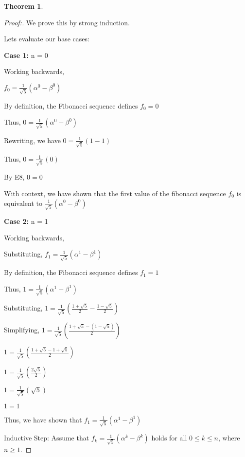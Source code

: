 \documentclass[12pt]{article}
\newtheorem{theorem}{Theorem}[section]
\begin{document}
\newpage

\begin{theorem}
\end{theorem}

\begin{proof}[Proof:]
    We prove this by strong induction.

    Lets evaluate our base cases:

    \medbreak

    \textbf{Case 1:} n = 0

    Working backwards, 

    $f_0 = \frac{1}{\sqrt{5}} (\alpha^0 - \beta^0)$

    By definition, the Fibonacci sequence defines $f_0 = 0$

    Thus, $0 = \frac{1}{\sqrt{5}} (\alpha^0 - \beta^0)$

    Rewriting, we have $0 = \frac{1}{\sqrt{5}} (1 - 1)$

    Thus, $0 = \frac{1}{\sqrt{5}} (0)$

    By E8, $0 = 0$

    With context, we have shown that the first value of the fibonacci sequence $f_0$ is equivalent to $\frac{1}{\sqrt{5}} (\alpha^0 - \beta^0)$

    \medbreak

    \textbf{Case 2:} n = 1

    Working backwards, 

    Substituting, $f_1 = \frac{1}{\sqrt{5}} (\alpha^1 - \beta^1)$

    By definition, the Fibonacci sequence defines $f_1 = 1$

    Thus, $1 =  \frac{1}{\sqrt{5}} (\alpha^1 - \beta^1)$

    Substituting, $1 =  \frac{1}{\sqrt{5}} (\frac{1 + \sqrt{5}}{2} - \frac{1 - \sqrt{5}}{2})$

    Simplifying, $1 =  \frac{1}{\sqrt{5}} (\frac{1 + \sqrt{5} - (1 - \sqrt{5})}{2})$

    $1 =  \frac{1}{\sqrt{5}} (\frac{1 + \sqrt{5} - 1 + \sqrt{5}}{2})$

    $1 =  \frac{1}{\sqrt{5}} (\frac{2\sqrt{5}}{2})$

    $1 =  \frac{1}{\sqrt{5}} (\sqrt{5})$

    $1 = 1$

    Thus, we have shown that $f_1 = \frac{1}{\sqrt{5}} (\alpha^1 - \beta^1)$

    \medbreak

    Inductive Step: Assume that \( f_k = \frac{1}{\sqrt{5}} (\alpha^k - \beta^k) \) holds for all \( 0 \leq k \leq n \), where \( n \geq 1 \).


\end{proof}
\end{document}

